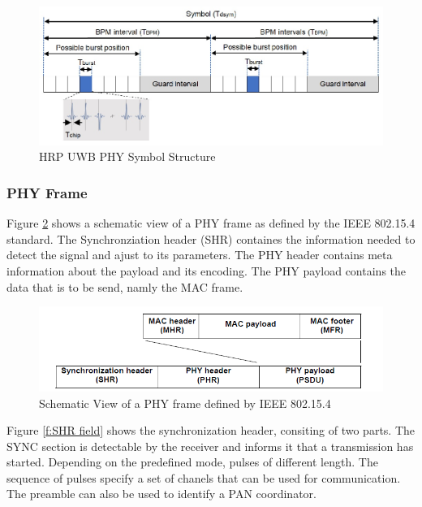 \begin{figure}[!ht]
\centering
\includegraphics[width=\linewidth]{graphics/HRP_UWB_PHY_symbol_structure.jpg}
\caption{HRP UWB PHY Symbol Structure \cite{hsu_2021}}
\label{f:symbol structure}
\end{figure}



\subsubsection{PHY Frame}
Figure \ref{f:PPDU general} shows a schematic view of a PHY frame as defined by the IEEE 802.15.4 standard.
The Synchronziation header (SHR) containes the information needed to detect the signal and ajust to its parameters.
The PHY header contains meta information about the payload and its encoding.
The PHY payload contains the data that is to be send, namly the MAC frame.

\begin{figure}[!ht]
\centering
\includegraphics[width=\linewidth]{graphics/Schematic_view_PPDU.png}
\caption{Schematic View of a PHY frame defined by IEEE 802.15.4 \cite{IEEE4-2020-7}}
\label{f:PPDU general}
\end{figure}


Figure \ref{f:SHR field} shows the synchronization header, consiting of two parts.
The SYNC section is detectable by the receiver and informs it that a transmission has started.
Depending on the predefined mode, pulses of different length.
The sequence of pulses specify a set of chanels that can be used for communication.
The preamble can also be used to identify a PAN coordinator.

